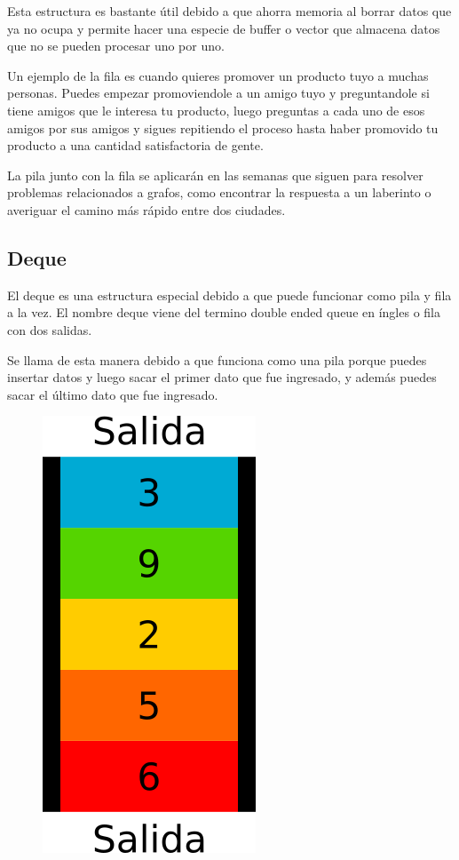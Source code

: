 \documentclass{article}
\begin{document}
Esta estructura es bastante útil debido a que ahorra memoria al borrar datos que ya no ocupa y permite hacer una especie de buffer o vector que almacena datos que no se pueden procesar uno por uno.

Un ejemplo de la fila es cuando quieres promover un producto tuyo a muchas personas. Puedes empezar promoviendole a un amigo tuyo y preguntandole si tiene amigos que le interesa tu producto, luego preguntas a cada uno de esos amigos por sus amigos y sigues repitiendo el proceso hasta haber promovido tu producto a una cantidad satisfactoria de gente.

La pila junto con la fila se aplicarán en las semanas que siguen para resolver problemas relacionados a grafos, como encontrar la respuesta a un laberinto o averiguar el camino más rápido entre dos ciudades.

\subsection{Deque}

El deque es una estructura especial debido a que puede funcionar como pila y fila a la vez. El nombre deque viene del termino double ended queue en íngles o fila con dos salidas.

Se llama de esta manera debido a que funciona como una pila porque puedes insertar datos y luego sacar el primer dato que fue ingresado, y además puedes sacar el último dato que fue ingresado.

\begin{figure}[H]
    \centering
    \includegraphics[width=0.1\paperwidth]{deque}
\end{figure}
\end{document}
